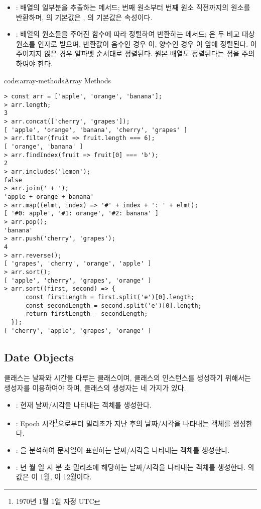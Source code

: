 \begin{itemize}
    \item {}: 배열의 일부분을 추출하는 메서드; 번째 원소부터 번째 원소 직전까지의 원소를 반환하며, 의 기본값은 , 의 기본값은  속성이다.
    \item {}: 배열의 원소들을 주어진 함수에 따라 정렬하여 반환하는 메서드; 은 두 비교 대상 원소를 인자로 받으며, 반환값이 음수인 경우 이, 양수인 경우 이 앞에 정렬된다. 이 주어지지 않은 경우 알파벳 순서대로 정렬된다. 원본 배열도 정렬된다는 점을 주의하여야 한다.
\end{itemize}

\begin{codeenv}{code:array-methods}{Array Methods}\begin{verbatim}
> const arr = ['apple', 'orange', 'banana'];
> arr.length;
3
> arr.concat(['cherry', 'grapes']);
[ 'apple', 'orange', 'banana', 'cherry', 'grapes' ]
> arr.filter(fruit => fruit.length === 6);
[ 'orange', 'banana' ]
> arr.findIndex(fruit => fruit[0] === 'b');
2
> arr.includes('lemon');
false
> arr.join(' + ');
'apple + orange + banana'
> arr.map((elmt, index) => '#' + index + ': ' + elmt);
[ '#0: apple', '#1: orange', '#2: banana' ]
> arr.pop();
'banana'
> arr.push('cherry', 'grapes');
4
> arr.reverse();
[ 'grapes', 'cherry', 'orange', 'apple' ]
> arr.sort();
[ 'apple', 'cherry', 'grapes', 'orange' ]
> arr.sort((first, second) => {
      const firstLength = first.split('e')[0].length;
      const secondLength = second.split('e')[0].length;
      return firstLength - secondLength;
  });
[ 'cherry', 'apple', 'grapes', 'orange' ]
\end{verbatim}
\end{codeenv}


\subsection*{Date Objects}

 클래스는 날짜와 시간을 다루는 클래스이며,  클래스의 인스턴스를 생성하기 위해서는 생성자를 이용하여야 하며,  클래스의 생성자는 네 가지가 있다.

\begin{itemize}
    \item {}: 현재 날짜/시각을 나타내는  객체를 생성한다.
    \item {}: Epoch 시각\footnote{1970년 1월 1일 자정 UTC}으로부터 밀리초가 지난 후의 날짜/시각을 나타내는  객체를 생성한다.
    \item {}: 을 분석하여 문자열이 표현하는 날짜/시각을 나타내는  객체를 생성한다.
    \item {}: 년 월 일 시 분 초  밀리초에 해당하는 날짜/시각을 나타내는  객체를 생성한다. 의 값은 이 1월, 이 12월이다.
\end{itemize}

